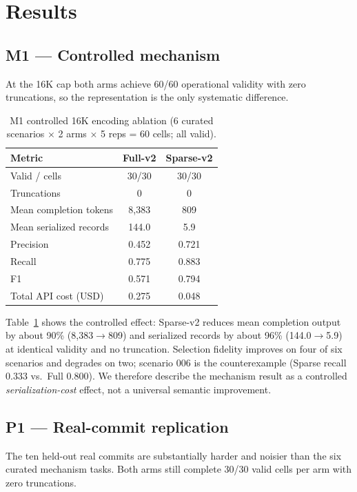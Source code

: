\section{Results}
\subsection{M1 — Controlled mechanism}
At the 16K cap both arms achieve 60/60 operational validity with zero
truncations, so the representation is the only systematic difference.

\begin{table}[t]
\caption{M1 controlled 16K encoding ablation (6 curated scenarios $\times$ 2
arms $\times$ 5 reps = 60 cells; all valid).}
\label{tab:m1}
\centering
\small
\begin{tabular}{lcc}
\toprule
\textbf{Metric} & \textbf{Full-v2} & \textbf{Sparse-v2} \\
\midrule
Valid / cells & 30/30 & 30/30 \\
Truncations & 0 & 0 \\
Mean completion tokens & 8,383 & 809 \\
Mean serialized records & 144.0 & 5.9 \\
Precision & 0.452 & 0.721 \\
Recall & 0.775 & 0.883 \\
F1 & 0.571 & 0.794 \\
Total API cost (USD) & 0.275 & 0.048 \\
\bottomrule
\end{tabular}
\end{table}

Table~\ref{tab:m1} shows the controlled effect: Sparse-v2 reduces mean
completion output by about 90\% (8,383$\rightarrow$809) and serialized records
by about 96\% (144.0$\rightarrow$5.9) at identical validity and no truncation.
Selection fidelity improves on four of six scenarios and degrades on two;
scenario 006 is the counterexample (Sparse recall 0.333 vs.\ Full 0.800). We
therefore describe the mechanism result as a controlled
\textit{serialization-cost} effect, not a universal semantic improvement.

\subsection{P1 — Real-commit replication}
The ten held-out real commits are substantially harder and noisier than the
six curated mechanism tasks. Both arms still complete 30/30 valid cells per arm
with zero truncations.

